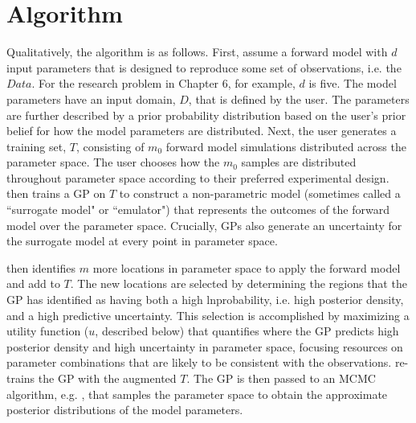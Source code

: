 \section{\approxposterior Algorithm} \label{AP:sec:app}

Qualitatively, the \approxposterior algorithm is as follows. First, assume a forward model with $d$ input parameters that is designed to reproduce some set of observations, i.e. the $Data$. For the research problem in Chapter 6, for example, $d$ is five. The model parameters have an input domain, $D$, that is defined by the user. The parameters are further described by a prior probability distribution based on the user's prior belief for how the model parameters are distributed.  Next, the user generates a training set, $T$, consisting of $m_0$ forward model simulations distributed across the parameter space. The user chooses how the $m_0$ samples are distributed throughout parameter space according to their preferred experimental design. \approxposterior then trains a GP on $T$ to construct a non-parametric model (sometimes called a ``surrogate model" or ``emulator") that represents the outcomes of the forward model over the parameter space. Crucially, GPs also generate an uncertainty for the surrogate model at every point in parameter space.

\approxposterior then identifies $m$ more locations in parameter space to apply the forward model and add to $T$. The new locations are selected by determining the regions that the GP has identified as having both a high lnprobability, i.e. high posterior density, and a high predictive uncertainty. This selection is accomplished by maximizing a utility function ($u$, described below) that quantifies where the GP predicts high posterior density and high uncertainty in parameter space, focusing resources on parameter combinations that are likely to be consistent with the observations. \approxposterior re-trains the GP with the augmented $T$. The GP is then passed to an MCMC algorithm, e.g. \emcee, that samples the parameter space to obtain the approximate posterior distributions of the model parameters.


